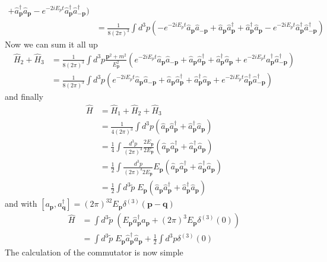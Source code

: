 \documentclass[10pt,a4paper]{report}
\theoremstyle{definition}
\begin{document}
\begin{enumerate}[a)]
\begin{align}
+
\hat{a}^\dagger_\mathbf{p}\hat{a}_\mathbf{p}
-
e^{-2iE_pt}\hat{a}^\dagger_\mathbf{p}\hat{a}^\dagger_\mathbf{-p}
)\\
&=\frac{1}{8(2\pi)^3}\int d^3p(-
e^{-2iE_pt}\hat{a}_\mathbf{p}\hat{a}_\mathbf{-p}
+
\hat{a}_\mathbf{p}\hat{a}^\dagger_\mathbf{p}
+
\hat{a}^\dagger_\mathbf{p}\hat{a}_\mathbf{p}
-
e^{-2iE_pt}\hat{a}^\dagger_\mathbf{p}\hat{a}^\dagger_\mathbf{-p}
)
\end{align}
Now we can sum it all up
\begin{align}
\hat{H}_2+\hat{H}_3
&=\frac{1}{8(2\pi)^3}\int d^3p\frac{\mathbf{p}^2+m^2}{E_\mathbf{p}^2}(
e^{-2iE_pt}\hat{a}_\mathbf{p}\hat{a}_\mathbf{-p}
+
\hat{a}_\mathbf{p}\hat{a}^\dagger_\mathbf{p}
+
\hat{a}^\dagger_\mathbf{p}\hat{a}_\mathbf{p}
+
e^{-2iE_pt}\hat{a}^\dagger_\mathbf{p}\hat{a}^\dagger_\mathbf{-p}
)\\
&=\frac{1}{8(2\pi)^3}\int d^3p(
e^{-2iE_pt}\hat{a}_\mathbf{p}\hat{a}_\mathbf{-p}
+
\hat{a}_\mathbf{p}\hat{a}^\dagger_\mathbf{p}
+
\hat{a}^\dagger_\mathbf{p}\hat{a}_\mathbf{p}
+
e^{-2iE_pt}\hat{a}^\dagger_\mathbf{p}\hat{a}^\dagger_\mathbf{-p}
)
\end{align}
and finally
\begin{align}
\hat{H}&=\hat{H}_1+\hat{H}_2+\hat{H}_3\\
&=\frac{1}{4(2\pi)^3}\int d^3p(
\hat{a}_\mathbf{p}\hat{a}^\dagger_\mathbf{p}
+\hat{a}^\dagger_\mathbf{p}\hat{a}_\mathbf{p}
)\\
&=\frac{1}{4}\int \frac{d^3p}{(2\pi)^3}\frac{2E_\mathbf{p}}{2E_\mathbf{p}}(
\hat{a}_\mathbf{p}\hat{a}^\dagger_\mathbf{p}
+\hat{a}^\dagger_\mathbf{p}\hat{a}_\mathbf{p}
)\\
&=\frac{1}{2}\int \frac{d^3p}{(2\pi)^3 2E_\mathbf{p}}E_\mathbf{p}(
\hat{a}_\mathbf{p}\hat{a}^\dagger_\mathbf{p}
+\hat{a}^\dagger_\mathbf{p}\hat{a}_\mathbf{p}
)\\
&=\frac{1}{2}\int d^3\tilde{p}\;
E_\mathbf{p}(
\hat{a}_\mathbf{p}\hat{a}^\dagger_\mathbf{p}
+\hat{a}^\dagger_\mathbf{p}\hat{a}_\mathbf{p}
)
\end{align}
and with $[a_\mathbf{p},a^\dagger_\mathbf{q}]=(2\pi)^32E_\mathbf{p}\delta^{(3)}(\mathbf{p}-\mathbf{q})$
\begin{align}
\hat{H}
&=\int d^3\tilde{p}\;(E_\mathbf{p}
\hat{a}^\dagger_\mathbf{p}\hat{a}_\mathbf{p}
+(2\pi)^3E_\mathbf{p}\delta^{(3)}(0))\\
&=\int d^3\tilde{p}\;E_\mathbf{p}
\hat{a}^\dagger_\mathbf{p}\hat{a}_\mathbf{p}
+\frac{1}{2}\int d^3p\delta^{(3)}(0)
\end{align}
The calculation of the commutator is now simple

\end{enumerate}
\end{document}
